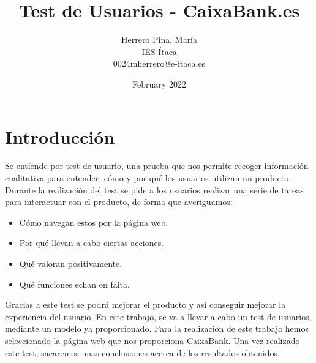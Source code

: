 \documentclass[openany,overnay,a4paper, twoside, 14pt]{book}
\title{\Huge Test de Usuarios - CaixaBank.es\\}
\author{
    Herrero Pina, María\\
    IES Ítaca\\
    0024mherrero@e-itaca.es\\
\date{February 2022}}
\begin{document}
\maketitle
\newpage
\tableofcontents
\rmfamily
\justify
\setcounter{chapter}{1}
\chapter*{Introducción}
Se entiende por test de usuario, una prueba que nos permite recoger información cualitativa para entender, cómo y por qué los usuarios utilizan un producto.\\Durante la realización del test se pide a los usuarios realizar una serie de tareas para interactuar con el producto, de forma que averiguamos:
\begin{itemize}
    \item Cómo navegan estos por la página web.
    \item Por qué llevan a cabo ciertas acciones.
    \item Qué valoran positivamente.
    \item Qué funciones echan en falta.
\end{itemize}
Gracias a este test se podrá mejorar el producto y así conseguir mejorar la experiencia del usuario.
En este trabajo, se va a llevar a cabo un test de usuarios, mediante un modelo ya proporcionado. Para la realización de este trabajo hemos seleccionado la página web que nos proporciona CaixaBank. Una vez realizado este test, sacaremos unas conclusiones acerca de los resultados obtenidos.
\end{document}
